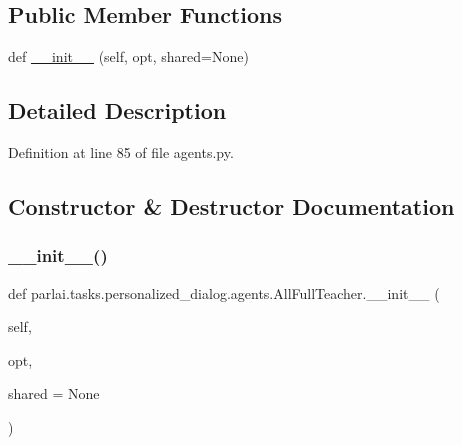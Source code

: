 \subsection*{Public Member Functions}
\begin{DoxyCompactItemize}
\item 
def \hyperlink{classparlai_1_1tasks_1_1personalized__dialog_1_1agents_1_1AllFullTeacher_a0ff199f278a48cb4c7979503ef501916}{\+\_\+\+\_\+init\+\_\+\+\_\+} (self, opt, shared=None)
\end{DoxyCompactItemize}


\subsection{Detailed Description}


Definition at line 85 of file agents.\+py.



\subsection{Constructor \& Destructor Documentation}
\mbox{\label{classparlai_1_1tasks_1_1personalized__dialog_1_1agents_1_1AllFullTeacher_a0ff199f278a48cb4c7979503ef501916}} 
\subsubsection{\texorpdfstring{\+\_\+\+\_\+init\+\_\+\+\_\+()}{\_\_init\_\_()}}
{\footnotesize\ttfamily def parlai.\+tasks.\+personalized\+\_\+dialog.\+agents.\+All\+Full\+Teacher.\+\_\+\+\_\+init\+\_\+\+\_\+ (\begin{DoxyParamCaption}\item[{}]{self,  }\item[{}]{opt,  }\item[{}]{shared = {\ttfamily None} }\end{DoxyParamCaption})}



